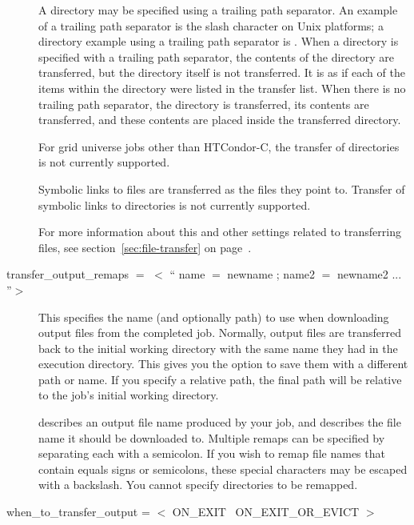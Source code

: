 \begin{description}
A directory may be specified using a trailing path separator.
An example of a trailing path separator is the slash character on Unix
platforms; a directory example using a trailing path separator
is . 
When a directory is specified with a trailing path separator,
the contents of the directory are
transferred,  but the directory itself is not transferred.
It is as if each of the items
within the directory were listed in the transfer list.
When there is no trailing path separator,
the directory is transferred, its contents are transferred,
and these contents are placed inside the transferred directory.

For grid universe jobs other than HTCondor-C, the transfer of
directories is not currently supported.

Symbolic links to files are transferred as the files they point to.
Transfer of symbolic links to directories is not currently supported.

For more information about this and other settings related to
transferring files, see section~\ref{sec:file-transfer} on
page~\pageref{sec:file-transfer}.


\label{man-condor-submit-transfer-output-remaps}
\item[transfer\_output\_remaps $=$ $<$ `` name $=$ newname ; name2 $=$ newname2 ... ''$>$ ]
This specifies the name (and optionally path) to use when downloading output
files from the completed job.  Normally, output files are transferred back
to the initial working directory with the same name they had in the execution
directory.  This gives you the option to save them with a different path
or name.  If you specify a relative path, the final path will be relative
to the job's initial working directory.

 describes an output file name produced by your job, and
 describes the file name it should be downloaded to.
Multiple remaps can be specified by separating each with a semicolon.
If you wish to remap file names that contain equals signs or
semicolons, these special characters may be escaped with a backslash.
You cannot specify directories to be remapped. 



\label{man-condor-submit-when-to-transfer-output}
\item[when\_to\_transfer\_output = $<$ ON\_EXIT \Bar\ ON\_EXIT\_OR\_EVICT $>$] 


\end{description}
